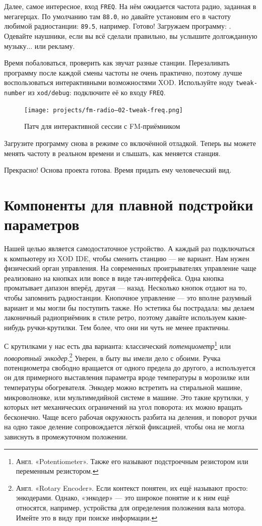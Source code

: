 Далее, самое интересное, вход \texttt{FREQ}. На нём ожидается частота радио, заданная в мегагерцах. По умолчанию там \texttt{88.0}, но давайте установим его в частоту любимой радиостанции: \texttt{89.5}, например.  Готово! Загружаем программу: . Одевайте наушники, если вы всё сделали правильно, вы услышите долгожданную музыку... или рекламу.

Время побаловаться, проверить как звучат разные станции. Перезаливать программу после каждой смены частоты не очень практично, поэтому лучше воспользоваться интерактивными возможностями XOD. Используйте ноду \texttt{tweak-number} из \texttt{xod/debug}: подключите её ко входу \texttt{FREQ}.

\begin{figure}
  \centering
  \texttt{[image: projects/fm-radio--02-tweak-freq.png]}
  \caption{Патч для интерактивной сессии с FM-приёмником}
\end{figure}

Загрузите программу снова в режиме со включённой отладкой. Теперь вы можете менять частоту в реальном времени и слышать, как меняется станция.

Прекрасно! Основа проекта готова. Время придать ему человеческий вид.

\section{Компоненты для плавной подстройки параметров}

Нашей целью является самодостаточное устройство. А каждый раз подключаться к компьютеру из XOD IDE, чтобы сменить станцию — не вариант. Нам нужен физический орган управления. На современных проигрывателях управление чаще реализовано на кнопках или вовсе в виде тач-интерфейса. Одна кнопка проматывает дапазон вперёд, другая — назад. Несколько кнопок отдают на то, чтобы запомнить радиостанции. Кнопочное управление — это вполне разумный вариант и мы могли бы поступить также. Но эстетика бы пострадала: мы делаем лаконичный радиоприёмник в стиле ретро, поэтому давайте используем какие-нибудь ручки-крутилки. Тем более, что они ни чуть не менее практичны.

С крутилками у нас есть два варианта: классический \emph{потенциометр}\footnote{Англ. «Potentiometer». Также его называют подстроечным резистором или переменным резистором.} или \emph{поворотный энкодер}.\footnote{Англ. «Rotary Encoder». Если контекст понятен, их ещё называют просто: энкодерами. Однако, «энкодер» — это широкое понятие и к ним ещё относятся, например, устройства для определения положения вала мотора.  Имейте это в виду при поиске информации.} Уверен, в быту вы имели дело с обоими. Ручка потенциометра свободно вращается от одного предела до другого, а используется он для примерного выставления параметра вроде температуры в морозилке или температуры обогревателя. Энкодер можно встретить на стиральной машине, микроволновке, или мультимедийной системе в машине. Это такие крутилки, у которых нет механических ограничений на угол поворота: их можно вращать бесконечно. Чаще всего рабочая окружность разбита на деления, и поворот ручки на одно такое деление сопровождается лёгкой фиксацией, чтобы она не могла зависнуть в промежуточном положении.

